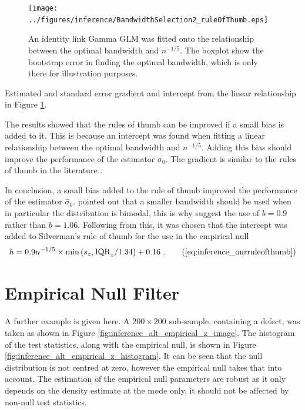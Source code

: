 \begin{figure}
	\centering
	\texttt{[image: ../figures/inference/BandwidthSelection2\_ruleOfThumb.eps]}
	\caption{An identity link Gamma GLM was fitted onto the relationship between the optimal bandwidth and $n^{-1/5}$. The boxplot show the bootstrap error in finding the optimal bandwidth, which is only there for illustration purposes.}
	\label{fig:inference_ZNull_mserule_of_thumb}
\end{figure}

\begin{table}
	\centering
	
	\caption{Estimated and standard error gradient and intercept from the linear relationship in Figure \ref{fig:inference_ZNull_mserule_of_thumb}.}
	\label{table:inference_ZNull_mse_glm_estimate}
\end{table}

The results showed that the rules of thumb can be improved if a small bias is added to it. This is because an intercept was found when fitting a linear relationship between the optimal bandwidth and $n^{-1/5}$. Adding this bias should improve the performance of the estimator $\widehat{\sigma}_0$. The gradient is similar to the rules of thumb in the literature \citep{sheather2004density}.

In conclusion, a small bias added to the rule of thumb improved the performance of the estimator $\widehat{\sigma}_0$. \cite{silverman1986density} pointed out that a smaller bandwidth should be used when in particular the distribution is bimodal, this is why \cite{silverman1986density} suggest the use of $b=0.9$ rather than $b=1.06$. Following from this, it was chosen that the intercept was added to Silverman's rule of thumb for the use in the empirical null
\begin{equation}
	h = 0.9n^{-1/5}\times\text{min}\left(s_z,\text{IQR}_z/1.34\right) + 0.16
	\ .
	\tag{\ref{eq:inference_ourruleofthumb}}
\end{equation}

\section{Empirical Null Filter}

A further example is given here. A $200\times200$ sub-sample, containing a defect, was taken as shown in Figure \ref{fig:inference_alt_empirical_z_image}. The histogram of the test statistics, along with the empirical null, is shown in Figure \ref{fig:inference_alt_empirical_z_histogram}. It can be seen that the null distribution is not centred at zero, however the empirical null takes that into account. The estimation of the empirical null parameters are robust as it only depends on the density estimate at the mode only, it should not be affected by non-null test statistics.

